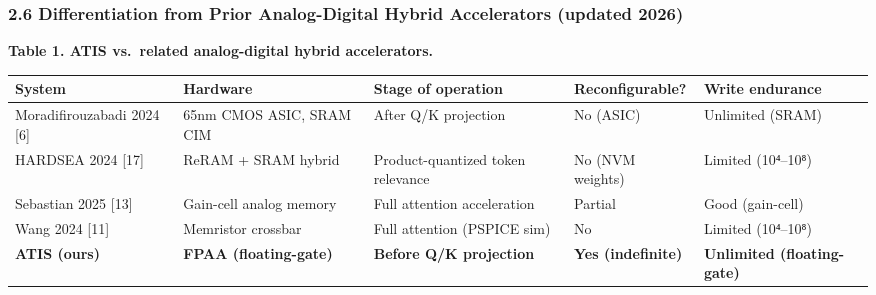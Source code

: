 \subsubsection{2.6 Differentiation from Prior Analog-Digital Hybrid
Accelerators (updated
2026)}\label{differentiation-from-prior-analog-digital-hybrid-accelerators-updated-2026}

\textbf{Table 1. ATIS vs.~related analog-digital hybrid accelerators.}

{\def\LTcaptype{none} %
\begin{longtable}[]{@{}
  >{\raggedright\arraybackslash}p{}
  >{\raggedright\arraybackslash}p{}
  >{\raggedright\arraybackslash}p{}
  >{\raggedright\arraybackslash}p{}
  >{\raggedright\arraybackslash}p{}@{}}
\toprule\noalign{}
\begin{minipage}[b]{\linewidth}\raggedright
System
\end{minipage} & \begin{minipage}[b]{\linewidth}\raggedright
Hardware
\end{minipage} & \begin{minipage}[b]{\linewidth}\raggedright
Stage of operation
\end{minipage} & \begin{minipage}[b]{\linewidth}\raggedright
Reconfigurable?
\end{minipage} & \begin{minipage}[b]{\linewidth}\raggedright
Write endurance
\end{minipage} \\
\midrule\noalign{}
\endhead
\bottomrule\noalign{}
\endlastfoot
Moradifirouzabadi 2024 {[}6{]} & 65nm CMOS ASIC, SRAM CIM & After Q/K
projection & No (ASIC) & Unlimited (SRAM) \\
HARDSEA 2024 {[}17{]} & ReRAM + SRAM hybrid & Product-quantized token
relevance & No (NVM weights) & Limited (10⁴--10⁸) \\
Sebastian 2025 {[}13{]} & Gain-cell analog memory & Full attention
acceleration & Partial & Good (gain-cell) \\
Wang 2024 {[}11{]} & Memristor crossbar & Full attention (PSPICE sim) &
No & Limited (10⁴--10⁸) \\
\textbf{ATIS (ours)} & \textbf{FPAA (floating-gate)} & \textbf{Before
Q/K projection} & \textbf{Yes (indefinite)} & \textbf{Unlimited
(floating-gate)} \\
\end{longtable}
}

